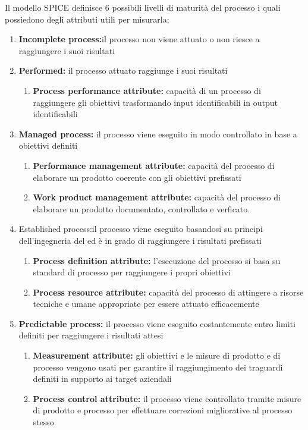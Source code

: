 \documentclass[12pt,a4paper]{article}
\begin{document}
Il modello SPICE definisce 6 possibili livelli di maturità del processo i quali possiedono
degli attributi utili per misurarla:
\begin{enumerate}
	\item\textbf{Incomplete process:}il processo non viene attuato o non riesce a raggiungere i
	suoi risultati
	\item\textbf{Performed:} il processo attuato raggiunge i suoi risultati
	\begin{enumerate}
		\item\textbf{Process performance attribute:} capacità di un processo di raggiungere gli obiettivi trasformando input identificabili in output identificabili
	\end{enumerate}
	
	\item\textbf{Managed process:} il processo viene eseguito in modo controllato in base a obiettivi definiti
	\begin{enumerate}
		\item\textbf{Performance management attribute:} capacità del processo di elaborare
		un prodotto coerente con gli obiettivi prefissati
		\item\textbf{ Work product management attribute:} capacità del processo di elaborare un prodotto documentato, controllato e verficato.
	\end{enumerate}
	\item{Established process:}il processo viene eseguito basandosi su principi dell'ingegneria
	del   ed è in grado di raggiungere i risultati prefissati
	\begin{enumerate}
		\item\textbf {Process definition attribute: }l'esecuzione del processo si basa su standard
		di processo per raggiungere i propri obiettivi
		\item\textbf{Process resource attribute: }capacità del processo di attingere a risorse
		tecniche e umane appropriate per essere attuato efficacemente
	\end{enumerate}
	\item\textbf{Predictable process:} il processo viene eseguito costantemente entro limiti definiti
	per raggiungere i risultati attesi
	\begin{enumerate}
		\item \textbf{ Measurement attribute:} gli obiettivi e le misure di prodotto e di processo
		vengono usati per garantire il raggiungimento dei traguardi definiti in
		supporto ai target aziendali
		\item\textbf{ Process control attribute:} il processo viene controllato tramite misure di prodotto e processo per effettuare correzioni migliorative al processo stesso
	\end{enumerate}
	

\end{enumerate}
\end{document}
